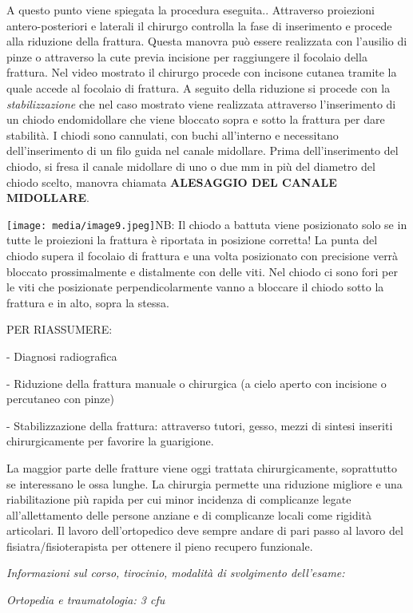 \documentclass[]{article}
\begin{document}
A questo punto viene spiegata la procedura eseguita.. Attraverso
proiezioni antero-posteriori e laterali il chirurgo controlla la fase di
inserimento e procede alla riduzione della frattura. Questa manovra può
essere realizzata con l'ausilio di pinze o attraverso la cute previa
incisione per raggiungere il focolaio della frattura. Nel video mostrato
il chirurgo procede con incisone cutanea tramite la quale accede al
focolaio di frattura. A seguito della riduzione si procede con la
\emph{stabilizzazione} che nel caso mostrato viene realizzata attraverso
l'inserimento di un chiodo endomidollare che viene bloccato sopra e
sotto la frattura per dare stabilità. I chiodi sono cannulati, con buchi
all'interno e necessitano dell'inserimento di un filo guida nel canale
midollare. Prima dell'inserimento del chiodo, si fresa il canale
midollare di uno o due mm in più del diametro del chiodo scelto, manovra
chiamata \textbf{ALESAGGIO DEL CANALE MIDOLLARE}.

\texttt{[image: media/image9.jpeg]}NB:
Il chiodo a battuta viene posizionato solo se in tutte le proiezioni la
frattura è riportata in posizione corretta! La punta del chiodo supera
il focolaio di frattura e una volta posizionato con precisione verrà
bloccato prossimalmente e distalmente con delle viti. Nel chiodo ci sono
fori per le viti che posizionate perpendicolarmente vanno a bloccare il
chiodo sotto la frattura e in alto, sopra la stessa.

PER RIASSUMERE:

- Diagnosi radiografica

- Riduzione della frattura manuale o chirurgica (a cielo aperto con
incisione o percutaneo con pinze)

- Stabilizzazione della frattura: attraverso tutori, gesso, mezzi di
sintesi inseriti chirurgicamente per favorire la guarigione.

La maggior parte delle fratture viene oggi trattata chirurgicamente,
soprattutto se interessano le ossa lunghe. La chirurgia permette una
riduzione migliore e una riabilitazione più rapida per cui minor
incidenza di complicanze legate all'allettamento delle persone anziane e
di complicanze locali come rigidità articolari. Il lavoro
dell'ortopedico deve sempre andare di pari passo al lavoro del
fisiatra/fisioterapista per ottenere il pieno recupero funzionale.

\emph{Informazioni sul corso, tirocinio, modalità di svolgimento
dell'esame:}

\emph{Ortopedia e traumatologia: 3 cfu }
\end{document}
